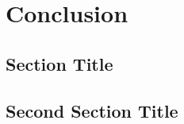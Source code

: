 
\chapter{Conclusion}
\label{ch:conclusion}
\blindtext

\section{Section Title}
\label{sec:conclusion-01}

\blindtext

\section{Second Section Title}
\label{sec:conclusion-02}

\blindtext
